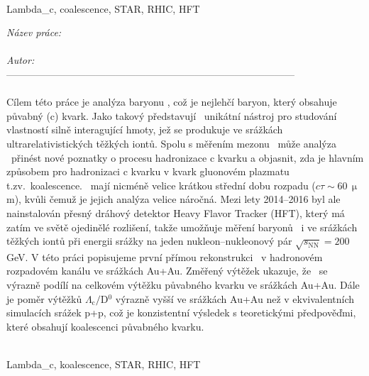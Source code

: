  \\
\noindent  Lambda\_c, coalescence, STAR, RHIC, HFT

%
 \newpage
 \noindent
{\it N\' azev pr\' ace:}\\
{\bf \czechtitle}\\

\noindent
{\it Autor:} \myself\\
--------------------------------------------------------------------------------------- \\


 \\
Cílem této práce je analýza baryonu \Lambdac, což je nejlehčí baryon, který obsahuje půvabný (c) kvark. Jako takový představují \Lambdac\ unikátní nástroj pro studování vlastností silně interagující hmoty, jež se produkuje ve srážkách ultrarelativistických těžkých iontů. Spolu s měřením mezonu \dzero\ může analýza \Lambdac\ přinést nové poznatky o procesu hadronizace c kvarku a objasnit, zda je hlavním způsobem pro hadronizaci c kvarku v kvark gluonovém plazmatu t.zv.\ koalescence. \Lambdac\ mají nicméně velice krátkou střední dobu rozpadu ($c \tau \sim 60\,\upmu$m), kvůli čemuž je jejich analýza velice náročná. Mezi lety 2014--2016 byl ale nainstalován přesný dráhový detektor Heavy Flavor Tracker (HFT), který má zatím ve světě ojedinělé rozlišení, takže umožňuje měření baryonů \Lambdac\ i ve srážkách těžkých iontů při energii srážky na jeden nukleon--nukleonový pár $\sqrt{s_\mathrm{NN}} = 200\,$GeV. V této práci popisujeme první přímou rekonstrukci \Lambdac\ v hadronovém rozpadovém kanálu ve srážkách Au+Au. Změřený výtěžek ukazuje, že \Lambdac\ se výrazně podílí na celkovém výtěžku půvabného kvarku ve srážkách Au+Au. Dále je poměr výtěžků $\Lambda_\mathrm{c}/$D$^0$ výrazně vyšší ve srážkách Au+Au než v ekvivalentních simulacích srážek p+p, což je konzistentní výsledek s teoretickými předpověďmi, které obsahují koalescenci půvabného kvarku. 

 \\
Lambda\_c, koalescence, STAR, RHIC, HFT






